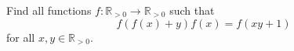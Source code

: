 Find all functions $f\colon \mathbb{R}_{>0} \rightarrow \mathbb{R}_{>0}$ such that
\[f(f(x) + y)f(x) = f(xy + 1)\]
for all \(x, y \in \mathbb{R}_{>0}\).
